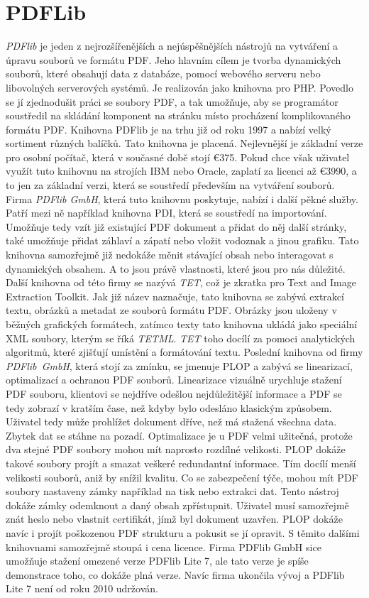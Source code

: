 \documentclass[czech,BP]{thesiskiv}
\begin{document}
\section{PDFLib}
\emph{PDFlib} je jeden z nejrozšířenějších a nejúspěšnějších nástrojů na vytváření a úpravu souborů ve formátu PDF. Jeho hlavním cílem je tvorba dynamických souborů, které obsahují data z databáze, pomocí webového serveru nebo libovolných serverových systémů. Je realizován jako knihovna pro PHP. Povedlo se jí zjednodušit práci se soubory PDF, a tak umožňuje, aby se programátor soustředil na skládání komponent na stránku místo procházení komplikovaného formátu PDF. Knihovna PDFlib je na trhu již od roku 1997 a nabízí velký sortiment různých balíčků. Tato knihovna je placená. Nejlevnější je základní verze pro osobní počítač, která v současné době stojí \euro 375. Pokud chce však uživatel využít tuto knihovnu na strojích IBM nebo Oracle, zaplatí za licenci až \euro 3990, a to jen za základní verzi, která se soustředí především na vytváření souborů. Firma \emph{PDFlib GmbH}, která tuto knihovnu poskytuje, nabízí i další pěkné služby. Patří mezi ně například knihovna PDI, která se soustředí na importování. Umožňuje tedy vzít již existující PDF dokument a přidat do něj další stránky, také umožňuje přidat záhlaví a zápatí nebo vložit vodoznak a jinou grafiku. Tato knihovna samozřejmě již nedokáže měnit stávající obsah nebo interagovat s dynamických obsahem. A to jsou právě vlastnosti, které jsou pro nás důležité. Další knihovna od této firmy se nazývá \emph{TET}, což je zkratka pro Text and Image Extraction Toolkit. Jak již název naznačuje, tato knihovna se zabývá extrakcí textu, obrázků a metadat ze souborů formátu PDF. Obrázky jsou uloženy v běžných grafických formátech, zatímco texty tato knihovna ukládá jako speciální XML soubory, kterým se říká \emph{TETML}. \emph{TET} toho docílí za pomoci analytických algoritmů, které zjišťují umístění a formátování textu. Poslední knihovna od firmy \mbox{\emph{PDFlib GmbH}}, která stojí za zmínku, se jmenuje PLOP a zabývá se linearizací, optimalizací a ochranou PDF souborů. Linearizace vizuálně urychluje stažení PDF souboru, klientovi se nejdříve odešlou nejdůležitější informace a PDF se tedy zobrazí v kratším čase, než kdyby bylo odesláno klasickým způsobem. Uživatel tedy může prohlížet dokument dříve, než má stažená všechna data. Zbytek dat se stáhne na pozadí. Optimalizace je u PDF velmi užitečná, protože dva stejné PDF soubory mohou mít naprosto rozdílné velikosti. PLOP dokáže takové soubory projít a smazat veškeré redundantní informace. Tím docílí menší velikosti souborů, aniž by snížil kvalitu. Co se zabezpečení týče, mohou mít PDF soubory nastaveny zámky například na tisk nebo extrakci dat. Tento nástroj dokáže zámky odemknout a daný obsah zpřístupnit. Uživatel musí samozřejmě znát heslo nebo vlastnit certifikát, jímž byl dokument uzavřen. PLOP dokáže navíc i projít poškozenou PDF strukturu a pokusit se jí opravit. S těmito dalšími knihovnami samozřejmě stoupá i cena licence. Firma PDFlib GmbH sice umožňuje stažení omezené verze PDFlib Lite 7, ale tato verze je spíše demonstrace toho, co dokáže plná verze. Navíc firma ukončila vývoj a PDFlib Lite 7 není od roku 2010 udržován\cite{PDFlib}.
\end{document}
